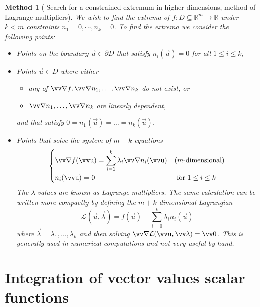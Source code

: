 \documentclass[twocolumn, margin=normal]{tex/hsrzf}
\theoremstyle{fuvarzf}
\newtheorem{method}{Method}
\begin{document}
\begin{method}[%
    Search for a constrained extremum in higher dimensions,
    method of Lagrange multipliers]
  We wish to find the extrema of \(f: D \subseteq \mathbb{R}^m \to \mathbb{R}\)
  under \(k < m\) constraints \(n_1 = 0, \cdots, n_k = 0\). To find the extrema 
  we consider the following points:
  \begin{itemize}
    \item Points on the boundary \(\vec{u} \in \partial D\) that satisfy
      \(n_i(\vec{u}) = 0\) for all \(1 \leq i \leq k\), 

    \item Points \(\vec{u} \in D\) where either
      \begin{itemize}
        \item any of \(\grad f, \grad n_1, \ldots, \grad n_k\) do not exist, or
        \item \(\grad n_1, \ldots, \grad n_k\) are linearly \emph{dependent},
      \end{itemize}
      and that satisfy \(0 = n_1(\vec{u}) = \ldots = n_k(\vec{u})\).

    \item Points that solve the system of \(m+k\) equations
      \[
        \begin{dcases}
          \grad f(\vec{u}) = \sum_{i = 1}^k \lambda_i \grad n_i(\vec{u})
            & (m\text{-dimensional}) \\
          n_i(\vec{u}) = 0  & \text{ for } 1 \leq i \leq k
        \end{dcases}
      \]
      The \(\lambda\) values are known as \emph{Lagrange multipliers}. The same
      calculation can be written more compactly by defining the
      \(m+k\) dimensional \emph{Lagrangian}
      \[
        \mathcal{L}(\vec{u}, \vec{\lambda}) 
          = f(\vec{u}) - \sum_{i = 0}^k \lambda_i n_i(\vec{u})
      \]
      where \(\vec{\lambda} = \lambda_1, \ldots, \lambda_k\) and then solving
      \(\grad \mathcal{L}(\vec{u}, \vec{\lambda}) = \vec{0}\).  This is
      generally used in numerical computations and not very useful by hand.
  \end{itemize}
\end{method}

\section{Integration of vector values scalar functions}
\end{document}
